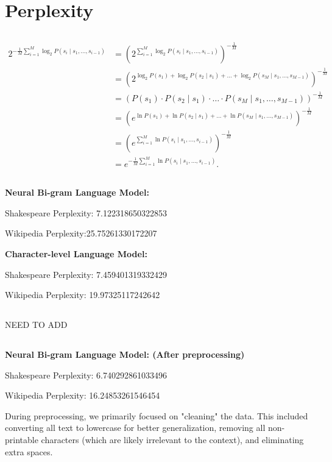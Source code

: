 \documentclass{article}
\begin{document}
\section{Perplexity}
\subsection{}
\begin{align*}
2^{-\frac{1}{M} \sum_{i=1}^{M} \log_2 P(s_i \mid s_1, \dots, s_{i-1})} 
&= \left(2^{\sum_{i=1}^{M} \log_2 P(s_i \mid s_1, \dots, s_{i-1})}\right)^{-\frac{1}{M}} \\
&= \left(2^{\log_2 P(s_1) + \log_2 P(s_2 \mid s_1) + \dots + \log_2 P(s_M \mid s_1, \dots, s_{M-1})}\right)^{-\frac{1}{M}} \\
&= \left(P(s_1) \cdot P(s_2 \mid s_1) \cdot \dots \cdot P(s_M \mid s_1, \dots, s_{M-1})\right)^{-\frac{1}{M}} \\
&= \left(e^{\ln P(s_1) + \ln P(s_2 \mid s_1) + \dots + \ln P(s_M \mid s_1, \dots, s_{M-1})}\right)^{-\frac{1}{M}} \\
&= \left(e^{\sum_{i=1}^{M} \ln P(s_i \mid s_1, \dots, s_{i-1})}\right)^{-\frac{1}{M}} \\
&= e^{-\frac{1}{M} \sum_{i=1}^{M} \ln P(s_i \mid s_1, \dots, s_{i-1})}.
\end{align*}
\subsection{}
\textbf{Neural Bi-gram Language Model:}

Shakespeare Perplexity:
7.122318650322853

Wikipedia Perplexity:25.75261330172207

\textbf{Character-level Language
Model:}

Shakespeare Perplexity: 7.459401319332429

Wikipedia Perplexity: 19.97325117242642
\subsection{}
NEED TO ADD
\subsection{}
\textbf{Neural Bi-gram Language Model: (After preprocessing)}

Shakespeare Perplexity: 6.740292861033496

Wikipedia Perplexity: 16.24853261546454

During preprocessing, we primarily focused on "cleaning" the data. This included converting all text to lowercase for better generalization, removing all non-printable characters (which are likely irrelevant to the context), and eliminating extra spaces.
\end{document}

